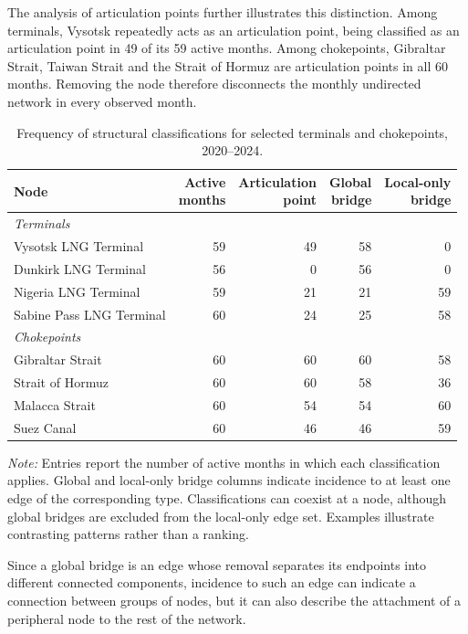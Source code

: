 \documentclass[pdftex,12pt,openright,a4paper,oneside]{book}
\begin{document}
The analysis of articulation points further illustrates this distinction. 
Among terminals, Vysotsk repeatedly acts as an articulation point, being classified as an articulation point in 49 of its 59 active months. 
Among chokepoints, Gibraltar Strait, Taiwan Strait and the Strait of Hormuz are articulation points in all 60 months. 
Removing the node therefore disconnects the monthly undirected network in every observed month.

\begin{table}[htbp]
\centering
\small
\setlength{\tabcolsep}{3pt}
\caption{Frequency of structural classifications for selected terminals and chokepoints, 2020--2024.}
\label{tab:node_structural_examples}
\begin{tabular}{lrrrr}
\toprule
Node & \shortstack{Active\newline months} & \shortstack{Articulation\newline point} & \shortstack{Global\newline bridge} & \shortstack{Local-only\newline bridge} \tabularnewline
\midrule
\multicolumn{5}{l}{\textit{Terminals}} \tabularnewline
Vysotsk LNG Terminal & 59 & 49 & 58 & 0 \tabularnewline
Dunkirk LNG Terminal & 56 & 0 & 56 & 0 \tabularnewline
Nigeria LNG Terminal & 59 & 21 & 21 & 59 \tabularnewline
Sabine Pass LNG Terminal & 60 & 24 & 25 & 58 \tabularnewline
\midrule
\multicolumn{5}{l}{\textit{Chokepoints}} \tabularnewline
Gibraltar Strait & 60 & 60 & 60 & 58 \tabularnewline
Strait of Hormuz & 60 & 60 & 58 & 36 \tabularnewline
Malacca Strait & 60 & 54 & 54 & 60 \tabularnewline
Suez Canal & 60 & 46 & 46 & 59 \tabularnewline
\bottomrule
\end{tabular}

\medskip
\begin{minipage}{0.95\textwidth}
\footnotesize
\textit{Note:} Entries report the number of active months in which each classification applies. Global and local-only bridge columns indicate incidence to at least one edge of the corresponding type. Classifications can coexist at a node, although global bridges are excluded from the local-only edge set. Examples illustrate contrasting patterns rather than a ranking.
\end{minipage}
\end{table}

Since a global bridge is an edge whose removal separates its endpoints into different connected components, incidence to such an edge can indicate a connection between groups of nodes, but it can also describe the attachment of a peripheral node to the rest of the network.
\end{document}
